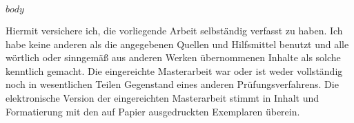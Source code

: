 \documentclass[a4paper,11pt]{article}
\begin{document}
	\newpage
	\pagestyle{plain}
	\setcounter{page}{1}    %
	
	$body$
	
	\newpage
	Hiermit versichere ich, die vorliegende Arbeit selbständig verfasst zu haben. Ich habe keine anderen als die angegebenen Quellen und Hilfsmittel benutzt und alle wörtlich oder sinngemäß aus   anderen   Werken   übernommenen   Inhalte   als   solche   kenntlich   gemacht.   Die   eingereichte Masterarbeit  war  oder  ist  weder  vollständig  noch  in  wesentlichen  Teilen  Gegenstand  eines  anderen Prüfungsverfahrens.  Die  elektronische  Version  der  eingereichten  Masterarbeit  stimmt  in  Inhalt  und Formatierung mit den auf Papier ausgedruckten Exemplaren überein.
	
	
\end{document}

